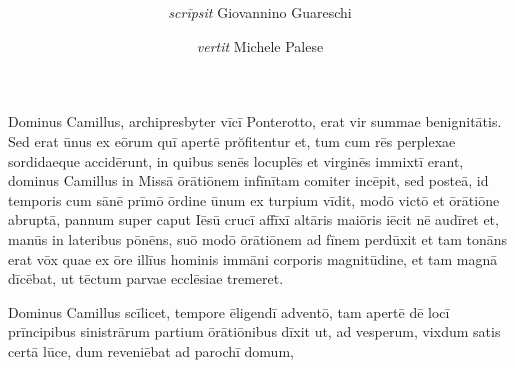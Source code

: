 \documentclass[a4paper, 12pt]{article}
\title{
	\MyTitle
}
\author{\textit{scrīpsit} Giovannino Guareschi \and \textit{vertit} Michele Palese}
\date{}
\newcommand{\DisableFootNotes}{%
	\renewcommand{\footnote}[2][]{\relax}
}
\begin{document}
	
	\maketitle
	
	\DisableFootNotes
	
	\resetlinenumber
	
	Dominus Camillus, archipresbyter vīcī Ponterotto, erat vir summae benignitātis.
	Sed erat ūnus ex eōrum quī apertē prŏfitentur et, tum cum rēs perplexae sordidaeque accidērunt, in quibus senēs locuplēs et virginēs immixtī erant, dominus Camillus in Missā ōrātiōnem infīnītam comiter incēpit, sed posteā, id temporis cum sānē prīmō ōrdine ūnum ex turpium vīdit, modō victō et ōrātiōne abruptā, pannum super caput Iēsū crucī affīxī altāris maiōris iēcit nē audīret et, manūs in lateribus pōnēns, suō modō ōrātiōnem ad fīnem perdūxit et tam tonāns erat vōx quae ex ōre illīus hominis immāni corporis magnitūdine, et tam magnā dīcēbat, ut tēctum parvae ecclēsiae tremeret.
	
	Dominus Camillus scīlicet, tempore ēligendī adventō, tam apertē dē locī prīncipibus sinistrārum partium ōrātiōnibus dīxit ut, ad vesperum, vixdum satis certā lūce, dum reveniēbat ad parochī domum,
	
\end{document}
